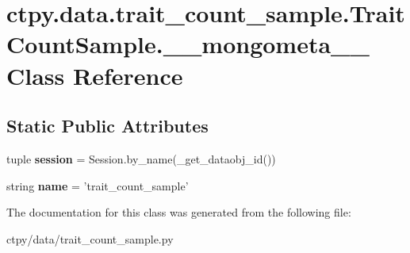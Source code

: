 \hypertarget{classctpy_1_1data_1_1trait__count__sample_1_1_trait_count_sample_1_1____mongometa____}{\section{ctpy.\-data.\-trait\-\_\-count\-\_\-sample.\-Trait\-Count\-Sample.\-\_\-\-\_\-mongometa\-\_\-\-\_\- Class Reference}
\label{classctpy_1_1data_1_1trait__count__sample_1_1_trait_count_sample_1_1____mongometa____}
}
\subsection*{Static Public Attributes}
\begin{DoxyCompactItemize}
\item 
\hypertarget{classctpy_1_1data_1_1trait__count__sample_1_1_trait_count_sample_1_1____mongometa_____a6f9d747aeff6277bcb9d59bc5f036ff3}{tuple {\bfseries session} = Session.\-by\-\_\-name(\-\_\-get\-\_\-dataobj\-\_\-id())}\label{classctpy_1_1data_1_1trait__count__sample_1_1_trait_count_sample_1_1____mongometa_____a6f9d747aeff6277bcb9d59bc5f036ff3}

\item 
\hypertarget{classctpy_1_1data_1_1trait__count__sample_1_1_trait_count_sample_1_1____mongometa_____a9e5aa2e046b79d27d38ce604f6e1ecc8}{string {\bfseries name} = 'trait\-\_\-count\-\_\-sample'}\label{classctpy_1_1data_1_1trait__count__sample_1_1_trait_count_sample_1_1____mongometa_____a9e5aa2e046b79d27d38ce604f6e1ecc8}

\end{DoxyCompactItemize}


The documentation for this class was generated from the following file\-:\begin{DoxyCompactItemize}
\item 
ctpy/data/trait\-\_\-count\-\_\-sample.\-py\end{DoxyCompactItemize}
